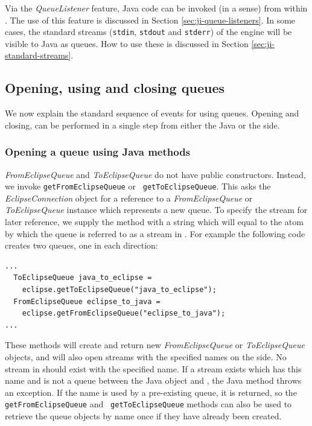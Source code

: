 Via the {\it QueueListener} feature, Java
code can be invoked (in a sense) from within {\eclipse}. The use of this
feature is discussed in Section \ref{sec:ji-queue-listeners}. In some
cases, the standard streams ({\tt stdin}, {\tt stdout} and {\tt stderr}) of
the {\eclipse} engine will be visible to Java as queues. How to use these
is discussed in Section \ref{sec:ji-standard-streams}.

\subsection{Opening, using and closing queues}
\label{sec:ji-open-close}
We now explain the standard sequence of events for using
queues. Opening and closing, can be performed in a single step from
either the Java or the {\eclipse} side.

\subsubsection*{Opening a queue using Java methods}

{\it FromEclipseQueue} and {\it ToEclipseQueue} do not have public
constructors. Instead, we invoke {\tt getFromEclipseQueue} or {\tt
getToEclipseQueue}. This asks the {\it EclipseConnection} object for a
reference to a {\it FromEclipseQueue} or {\it ToEclipseQueue} instance
which represents a new queue. To specify the stream for later
reference, we supply the method with a string which will equal to the
atom by which the queue is referred to as a stream in {\eclipse}. For
example the following code creates two queues, one in each direction:
\begin{verbatim}
...
  ToEclipseQueue java_to_eclipse = 
    eclipse.getToEclipseQueue("java_to_eclipse");
  FromEclipseQueue eclipse_to_java = 
    eclipse.getFromEclipseQueue("eclipse_to_java");
...
\end{verbatim}
These methods will create and return new {\it FromEclipseQueue} or
{\it ToEclipseQueue} objects, and will also open streams with the
specified names on the {\eclipse} side. No stream in {\eclipse} should
exist with the specified name. If a stream exists which has this name
and is not a queue between the Java object and {\eclipse}, the Java
method throws an exception. If the name is used by a pre-existing
queue, it is returned, so the {\tt getFromEclipseQueue} and {\tt
getToEclipseQueue} methods can also be used to retrieve the queue
objects by name once if they have already been created.

